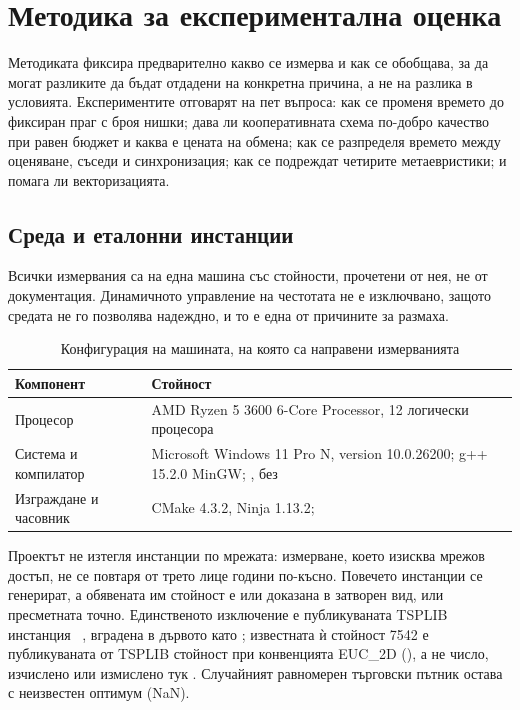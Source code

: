 \section{Методика за експериментална оценка}
\label{sec:method}

Методиката фиксира предварително какво се измерва и как се обобщава, за да могат разликите да бъдат
отдадени на конкретна причина, а не на разлика в условията. Експериментите отговарят на пет въпроса:
как се променя времето до фиксиран праг с броя нишки; дава ли кооперативната схема по-добро качество
при равен бюджет и каква е цената на обмена; как се разпределя времето между оценяване, съседи и
синхронизация; как се подреждат четирите метаевристики; и помага ли векторизацията.

\subsection{Среда и еталонни инстанции}
\label{subsec:method-environment}

Всички измервания са на една машина  със стойности, прочетени от нея, не от
документация. Динамичното управление на честотата не е изключвано, защото средата не го позволява
надеждно, и то е една от причините за размаха.

\begin{table}[htbp]
\centering
\renewcommand{\arraystretch}{0.9}
\caption{Конфигурация на машината, на която са направени измерванията}
\label{tab:environment}
\begin{adjustbox}{max width=\textwidth}
\begin{tabular}{@{}L{4.0cm}L{9.8cm}@{}}
\toprule
\textbf{Компонент} & \textbf{Стойност} \\
\midrule
Процесор & AMD Ryzen 5 3600 6-Core Processor, 12 логически процесора \\
Система и компилатор & Microsoft Windows 11 Pro N, version 10.0.26200; g++ 15.2.0 MinGW; , без  \\
Изграждане и часовник & CMake 4.3.2, Ninja 1.13.2;  \\
\bottomrule
\end{tabular}
\end{adjustbox}
\end{table}

Проектът не изтегля инстанции по мрежата: измерване, което изисква мрежов достъп, не се
повтаря от трето лице години по-късно. Повечето инстанции се генерират, а обявената им стойност
е или доказана в затворен вид, или пресметната точно. Единственото изключение е публикуваната
TSPLIB инстанция ~\cite{reinelt1991tsplib}, вградена в дървото като
; известната ѝ стойност 7542 е публикуваната от TSPLIB стойност при
конвенцията EUC\_2D (), а не число, изчислено или измислено тук .
Случайният равномерен търговски пътник остава с неизвестен оптимум (NaN).

